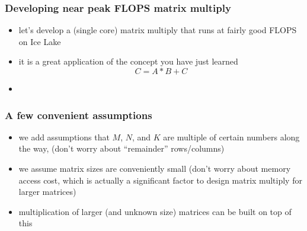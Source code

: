 \documentclass[12pt,dvipdfmx]{beamer}
\begin{document}
\begin{frame}
\frametitle{Developing near peak FLOPS matrix multiply}
\begin{itemize}
\item let's develop a (single core) matrix multiply that runs
  at fairly good FLOPS on Ice Lake
\item it is a great application of the concept you have just learned
\[ C = A * B + C \]
\item []
\begin{center}

%
\end{center}

\end{itemize}
\end{frame}

\begin{frame}
\frametitle{A few convenient assumptions}
\begin{itemize}
\item we add assumptions that $M$, $N$, and $K$ 
  are multiple of certain numbers along the way,
  (don't worry about ``remainder'' rows/columns)

\item we assume matrix sizes are conveniently small (don't worry about
  memory access cost, which is actually a significant factor to design
  matrix multiply for larger matrices)

\item multiplication of larger (and unknown size) matrices can be
  built on top of this
\end{itemize}
\end{frame}
\end{document}
